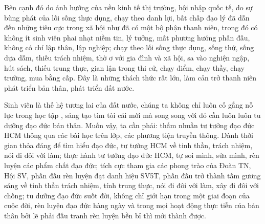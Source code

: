 Bên cạnh đó do ảnh hưởng của nền kinh tế thị trường, hội nhập quốc tế, do sự bùng phát của lối sống thực dụng, chạy theo danh lợi, bất chấp đạo lý đã dẫn đến những tiêu cực trong xã hội như đã có một bộ phận thanh niên, trong đó có không ít sinh viên phai nhạt niềm tin, lý tưởng, mất phương hướng phấn đấu, không có chí lập thân, lập nghiệp; chạy theo lối sống thực dụng, sống thử, sống dựa dẫm, thiếu trách nhiệm, thờ ơ với gia đình và xã hội, sa vào nghiện ngập, hút sách, thiếu trung thực, gian lận trong thi cử, chạy điểm, chạy thầy, chạy trường, mua bằng cấp. Đây là những thách thức rất lớn, làm cản trở thanh niên phát triển bản thân, phát triển đất nước.

Sinh viên là thế hệ tương lai của đất nước, chúng ta không chỉ luôn cố gắng nỗ lực trong học tập , sáng tạo tìm tòi cái mới mà song song với đó cần luôn luôn tu dưỡng đạo đức bản thân. Muốn vậy, ta cần phải: thấm nhuần tư tưởng đạo đức HCM thông qua các bài học trên lớp, các phương tiện truyền thông. Dành thời gian thỏa đáng để tìm hiểu đạo đức, tư tưởng HCM về tinh thần, trách nhiệm, nói đi đôi với làm; thực hành tư tưởng đạo đức HCM, tự soi mình, sửa mình, rèn luyện các phẩm chất đạo đức; tích cực tham gia các phong trào của Đoàn TN, Hội SV, phấn đấu rèn luyện đạt danh hiệu SV5T, phấn đấu trở thành tấm gương sáng về tinh thần trách nhiệm, tính trung thực, nói đi đôi với làm, xây đi đôi với chống; tu dưỡng đạo đức suốt đời, không chỉ giới hạn trong một giai đoạn của cuộc đời, rèn luyện đạo đức hàng ngày và trong mọi hoạt động thực tiễn của bản thân bởi lẽ phải đấu tranh rèn luyện bền bỉ thì mới thành được.
